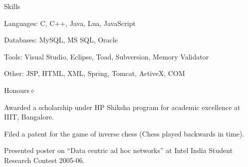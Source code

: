 \documentclass{resume}
\begin{document}
\begin{category}{Skills}{}

    \item {\topic Languages:} C, C++, Java, Lua, JavaScript
    \item {\topic Databases:} MySQL, MS SQL, Oracle
    \item {\topic Tools:} Visual Studio,  Eclipse, Toad, Subversion, Memory
        Validator
    \item {\topic Other:} JSP, HTML, XML, Spring, Tomcat,  ActiveX, COM

\end{category}


\begin{category}{Honours}{$\diamond$}

    \item Awarded a scholarship under HP Shiksha program for academic excellence at
        IIIT, Bangalore.

    \item Filed a patent for the game of inverse chess (Chess played backwards
        in time).

    \item Presented poster on ``Data centric ad hoc networks'' at Intel India
        Student Research Contest 2005-06.

\end{category}
\end{document}
